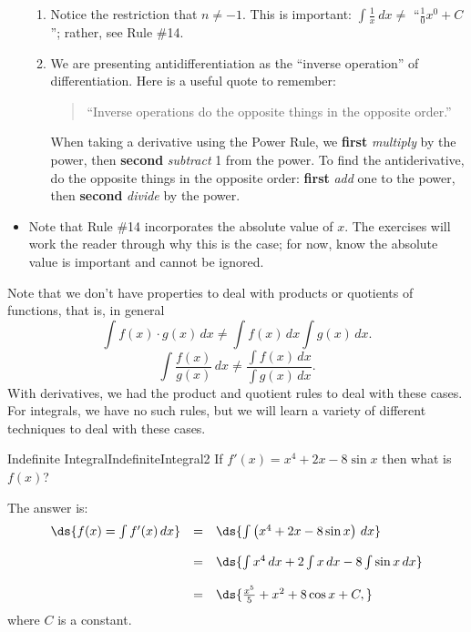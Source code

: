 \begin{itemize}
\begin{enumerate}
		\item		Notice the restriction that $n\neq -1$. This is important: $\int \frac{1}{x}\ dx \neq $ ``$\frac{1}{0}x^0+C$''; rather, see Rule \#14.
		\item		We are presenting antidifferentiation as the ``inverse operation'' of differentiation. Here is a useful quote to remember:
		\begin{quote}%
		``Inverse operations do the opposite things in the opposite order.''
		\end{quote}
		When taking a derivative using the Power Rule, we \textbf{first} \textit{multiply} by the power, then \textbf{second} \textit{subtract} 1 from the power. To find the antiderivative, do the opposite things in the opposite order: \textbf{first} \textit{add} one to the power, then \textbf{second} \textit{divide} by the power.
			\end{enumerate}
		\item		Note that Rule \#14 incorporates the absolute value of $x$. The exercises will work the reader through why this is the case; for now, know the absolute value is important and cannot be ignored.
\end{itemize}


Note that we don't have properties to deal with products or quotients of functions, that is, in general
$$\int f(x)\cdot g(x)\,dx\neq \int f(x)\,dx\int g(x)\,dx.$$
$$\int \frac{f(x)}{g(x)}\,dx\neq \frac{\int f(x)\,dx}{\int g(x)\,dx}.$$
With derivatives, we had the product and quotient rules to deal with these cases.
For integrals, we have no such rules, but we will learn a variety of different techniques to deal with these cases.


\begin{example}{Indefinite Integral}{IndefiniteIntegral2}
If $f'(x)=x^4+2x-8\sin x$ then what is $f(x)$?
\end{example}

\begin{solution} 
The answer is:
$$\begin{array}{rcl}
\ds{f(x)=\int f'(x)\,dx}&=&\ds{\int \left(x^4+2x-8\sin x\right)\,dx}\\
\\
&=&\ds{ \int x^4 \,dx + 2\int x\,dx -8 \int \sin x\,dx }\\
\\
&=&\ds{\frac{x^5}{5}+x^2+8\cos x+C,}\\
\end{array}$$
where $C$ is a constant.
\end{solution}


